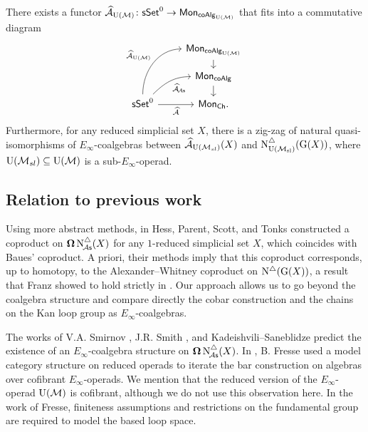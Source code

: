 \begin{theorem} \label{t:2nd main thm in the intro}
	There exists a functor $\operatorname{\mathcal{\widehat{A}}}_{\operatorname{U}(\mathcal{M})} \colon \mathsf{sSet}^0 \to \mathsf{Mon}_{\mathsf{coAlg}_{\operatorname{U}(\mathcal{M})}}$ that fits into a commutative diagram
	\[
	\begin{tikzcd}[row sep=small]
	& \Mon_{\coAlg_\UM} \arrow[d] \\
	& \Mon_{\coAlg} \arrow[d] \\
	\sSet^0
	\arrow[r, "\Ahat"', ]
	\arrow[ru, "\Ahat_{\!\As}"', out=45, in=180]
	\arrow[ruu, "\Ahat_\UM", out=90, in=180]
	& \Mon_{\Ch}.
	\end{tikzcd}
	\]
	Furthermore, for any reduced simplicial set $X$, there is a zig-zag of natural quasi-isomorphisms of $E_\infty$-coalgebras between $\operatorname{\mathcal{\widehat{A}}}_{\operatorname{U}(\mathcal{M}_{sl})}(X)$ and $\operatorname{N^{\triangle}_{{\operatorname{U}(\mathcal{M}_{sl})}}}(\operatorname{G}(X))$, where ${\operatorname{U}(\mathcal{M}_{sl})} \subseteq {\operatorname{U}(\mathcal{M})}$ is a sub-$E_\infty$-operad.
\end{theorem}

\subsection*{Relation to previous work}

Using more abstract methods, in \cite{hess2006adamshilton} Hess, Parent, Scott, and Tonks constructed a coproduct on $\operatorname{\mathbf{\Omega}} \operatorname{N^{\triangle}_{\!{\mathcal{A}\mathsf{s}}}}(X)$ for any $1$-reduced simplicial set $X$, which coincides with Baues' coproduct.
A priori, their methods imply that this coproduct corresponds, up to homotopy, to the Alexander--Whitney coproduct on $\operatorname{N^{\triangle}}(\operatorname{G}(X))$, a result that Franz showed to hold strictly in \cite{franz2020szczarba}.
Our approach allows us to go beyond the coalgebra structure and compare directly the cobar construction and the chains on the Kan loop group as $E_{\infty}$-coalgebras.

The works of V.A. Smirnov \cite{smirnov1990iterated}, J.R. Smith \cite{smith1994cobar, smith2000operads}, and Kadeishvili–Saneblidze \cite{kadeishvili1998iterating} predict the existence of an $E_\infty$-coalgebra structure on $\operatorname{\mathbf{\Omega}} \operatorname{N^{\triangle}_{\!{\mathcal{A}\mathsf{s}}}}(X)$.
In \cite{fresse2010bar}, B. Fresse used a model category structure on reduced operads \cite{berger2003modelcategory, hinich1997homologicalalgebra} to iterate the bar construction on algebras over cofibrant $E_\infty$-operads.
We mention that the reduced version of the $E_\infty$-operad ${\operatorname{U}(\mathcal{M})}$ is cofibrant, although we do not use this observation here.
In the work of Fresse, finiteness assumptions and restrictions on the fundamental group are required to model the based loop space.

